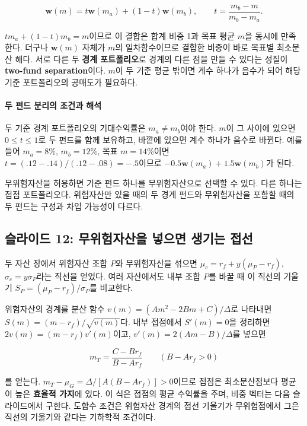 \documentclass[11pt,a4paper]{article}
\begin{document}
\[
\mathbf w(m)=t\mathbf w(m_a)+(1-t)\mathbf w(m_b),
\qquad t=\frac{m_b-m}{m_b-m_a}.
\]

$t m_a+(1-t)m_b=m$이므로 이 결합은 합계 비중 1과 목표 평균 $m$을 동시에 만족한다. 더구나 $\mathbf w(m)$ 자체가 $m$의 일차함수이므로 결합한 비중이 바로 목표별 최소분산 해다. 서로 다른 두 \textbf{경계 포트폴리오}로 경계의 다른 점을 만들 수 있다는 성질이 \textbf{two-fund separation}이다. $m$이 두 기준 평균 밖이면 계수 하나가 음수가 되어 해당 기준 포트폴리오의 공매도가 필요하다.
\par

\paragraph{두 펀드 분리의 조건과 해석}

두 기준 경계 포트폴리오의 기대수익률은 $m_a\ne m_b$여야 한다. $m$이 그 사이에 있으면 $0\le t\le1$로 두 펀드를 함께 보유하고, 바깥에 있으면 계수 하나가 음수로 바뀐다. 예를 들어 $m_a=8\%$, $m_b=12\%$, 목표 $m=14\%$이면 $t=(.12-.14)/(.12-.08)=-.5$이므로 $-0.5\mathbf w(m_a)+1.5\mathbf w(m_b)$가 된다.
\par

무위험자산을 허용하면 기준 펀드 하나를 무위험자산으로 선택할 수 있다. 다른 하나는 접점 포트폴리오다. 위험자산만 있을 때의 두 경계 펀드와 무위험자산을 포함할 때의 두 펀드는 구성과 차입 가능성이 다르다.
\par

\subsection{슬라이드 12: 무위험자산을 넣으면 생기는 접선}

두 자산 장에서 위험자산 조합 $P$와 무위험자산을 섞으면 $\mu_c=r_f+y(\mu_P-r_f)$, $\sigma_c=y\sigma_P$라는 직선을 얻었다. 여러 자산에서도 내부 조합 $P$를 바꿀 때 이 직선의 기울기 $S_P=(\mu_P-r_f)/\sigma_P$를 비교한다.
\par

위험자산의 경계를 분산 함수 $v(m)=(Am^2-2Bm+C)/\Delta$로 나타내면 $S(m)=(m-r_f)/\sqrt{v(m)}$다. 내부 접점에서 $S'(m)=0$을 정리하면 $2v(m)=(m-r_f)v'(m)$이고, $v'(m)=2(Am-B)/\Delta$를 넣으면
\par

\[
m_T=\frac{C-Br_f}{B-Ar_f}\qquad(B-Ar_f>0)
\]

를 얻는다. $m_T-\mu_G=\Delta/[A(B-Ar_f)]>0$이므로 접점은 최소분산점보다 평균이 높은 \textbf{효율적 가지}에 있다. 이 식은 접점의 평균 수익률을 주며, 비중 벡터는 다음 슬라이드에서 구한다. 도함수 조건은 위험자산 경계의 접선 기울기가 무위험점에서 그은 직선의 기울기와 같다는 기하학적 조건이다.
\par
\end{document}
